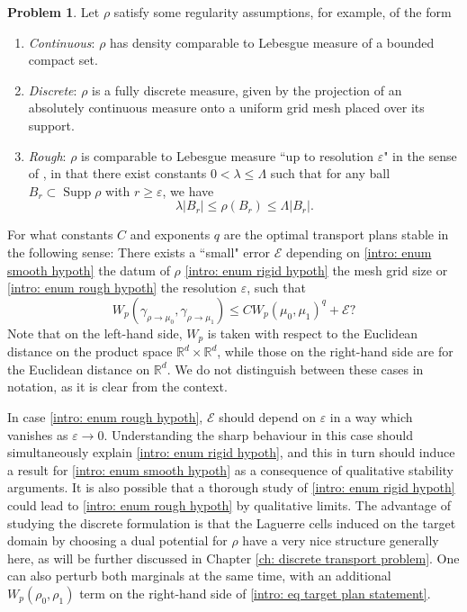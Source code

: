 \documentclass[11pt, oneside, titlepage]{book}
\theoremstyle{plain}
\theoremstyle{definition}
\newtheorem{problem}{Problem}
\newcommand{\R}{\mathbb{R}}
\DeclareMathOperator{\supp}{Supp}
\begin{document}
\begin{problem}
\label{problem: general plan stability}
Let $\rho$ satisfy some regularity assumptions, for example, of the form
\begin{enumerate}[label = (\roman*)]
    \item \label{intro: enum smooth hypoth} \textit{Continuous}: $\rho$ has density comparable to Lebesgue measure of a bounded compact set.

    \item \label{intro: enum rigid hypoth} \textit{Discrete}: $\rho$ is a fully discrete measure, given by the projection of an absolutely continuous measure onto a uniform grid mesh placed over its support.
    
    \item \label{intro: enum rough hypoth} \textit{Rough}: $\rho$ is comparable to Lebesgue measure ``up to resolution $\varepsilon$" in the sense of \cite[Assumption 1]{jabin2023h}, in that there exist constants $0<\lambda \leq \Lambda$ such that for any ball $B_r \subset \supp \rho$ with $r \geq \varepsilon$, we have
    \begin{equation*}
        \lambda|B_r| \leq \rho(B_r) \leq \Lambda|B_r|.
    \end{equation*}
\end{enumerate}
For what constants $C$ and exponents $q$ are the optimal transport plans stable in the following sense: There exists a ``small" error $\mathcal{E}$ depending on \ref{intro: enum smooth hypoth} the datum of $\rho$ \ref{intro: enum rigid hypoth} the mesh grid size or \ref{intro: enum rough hypoth} the resolution $\varepsilon$, such that
\begin{equation}
\label{intro: eq target plan statement}
    W_p(\gamma_{\rho \to \mu_0}, \gamma_{\rho \to \mu_1}) \leq C W_p(\mu_0, \mu_1)^q + \mathcal{E}?
\end{equation}
Note that on the left-hand side, $W_p$ is taken with respect to the Euclidean distance on the product space $\R^d \times \R^d$, while those on the right-hand side are for the Euclidean distance on $\R^d$. We do not distinguish between these cases in notation, as it is clear from the context. 
\end{problem}

In case \ref{intro: enum rough hypoth}, $\mathcal{E}$ should depend on $\varepsilon$ in a way which vanishes as $\varepsilon \to 0$. Understanding the sharp behaviour in this case should simultaneously explain \ref{intro: enum rigid hypoth}, and this in turn should induce a result for \ref{intro: enum smooth hypoth} as a consequence of qualitative stability arguments. It is also possible that a thorough study of \ref{intro: enum rigid hypoth} could lead to \ref{intro: enum rough hypoth} by qualitative limits. The advantage of studying the discrete formulation is that the Laguerre cells induced on the target domain by choosing a dual potential for $\rho$ have a very nice structure generally here, as will be further discussed in Chapter \ref{ch: discrete transport problem}. One can also perturb both marginals at the same time, with an additional $W_p(\rho_0, \rho_1)$ term on the right-hand side of \eqref{intro: eq target plan statement}. 
\end{document}
